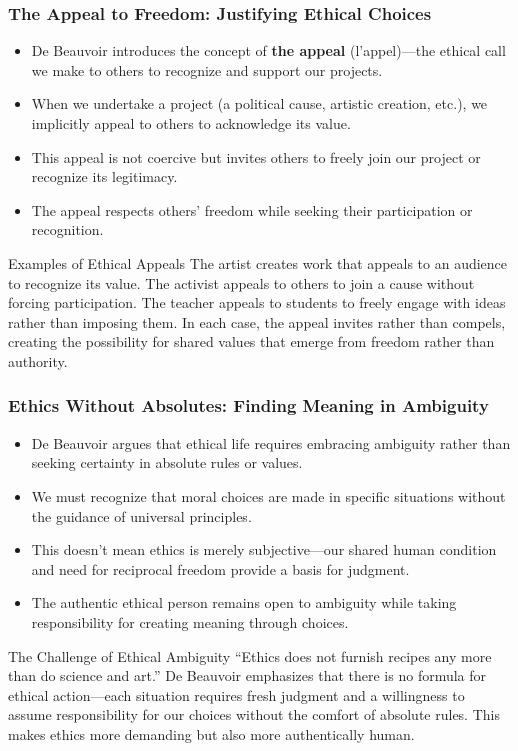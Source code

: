 \documentclass[aspectratio=169]{beamer}
\begin{document}
		\begin{frame}
			\frametitle{The Appeal to Freedom: Justifying Ethical Choices}
			\begin{itemize}
				\item De Beauvoir introduces the concept of \textbf{the appeal} (l'appel)—the ethical call we make to others to recognize and support our projects.
				\item When we undertake a project (a political cause, artistic creation, etc.), we implicitly appeal to others to acknowledge its value.
				\item This appeal is not coercive but invites others to freely join our project or recognize its legitimacy.
				\item The appeal respects others' freedom while seeking their participation or recognition.
			\end{itemize}
			
			\begin{exampleblock}{Examples of Ethical Appeals}
				The artist creates work that appeals to an audience to recognize its value. The activist appeals to others to join a cause without forcing participation. The teacher appeals to students to freely engage with ideas rather than imposing them. In each case, the appeal invites rather than compels, creating the possibility for shared values that emerge from freedom rather than authority.
			\end{exampleblock}
		\end{frame}
		
		\begin{frame}
			\frametitle{Ethics Without Absolutes: Finding Meaning in Ambiguity}
			\begin{itemize}
				\item De Beauvoir argues that ethical life requires embracing ambiguity rather than seeking certainty in absolute rules or values.
				\item We must recognize that moral choices are made in specific situations without the guidance of universal principles.
				\item This doesn't mean ethics is merely subjective—our shared human condition and need for reciprocal freedom provide a basis for judgment.
				\item The authentic ethical person remains open to ambiguity while taking responsibility for creating meaning through choices.
			\end{itemize}
			
			\begin{alertblock}{The Challenge of Ethical Ambiguity}
				``Ethics does not furnish recipes any more than do science and art.'' De Beauvoir emphasizes that there is no formula for ethical action—each situation requires fresh judgment and a willingness to assume responsibility for our choices without the comfort of absolute rules. This makes ethics more demanding but also more authentically human.
			\end{alertblock}
		\end{frame}
		
\end{document}
